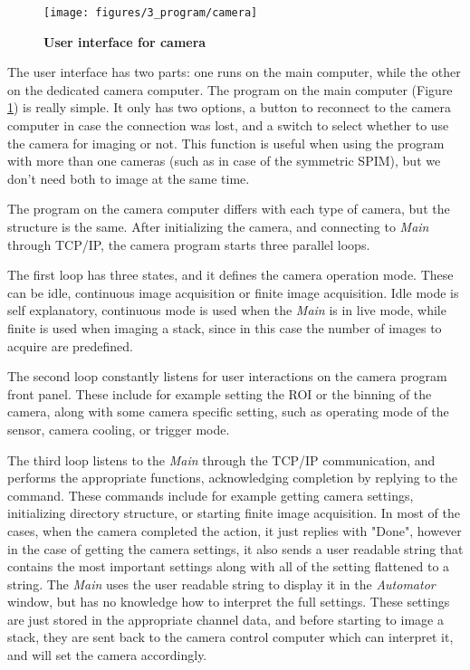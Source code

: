 \documentclass{diploma_style}
\begin{document}
\begin{figure}[htbp]
	\centering
	\texttt{[image: figures/3\_program/camera]}
	\caption{\textbf{User interface for camera}}
	\label{fig:ui_camera}
\end{figure}

The user interface has two parts: one runs on the main computer, while the other on the dedicated camera computer. The program on the main computer (Figure \ref{fig:ui_camera}) is really simple. It only has two options, a button to reconnect to the camera computer in case the connection was lost, and a switch to select whether to use the camera for imaging or not. This function is useful when using the program with more than one cameras (such as in case of the symmetric SPIM), but we don't need both to image at the same time.

The program on the camera computer differs with each type of camera, but the structure is the same. After initializing the camera, and connecting to \emph{Main} through TCP/IP, the camera program starts three parallel loops.

The first loop has three states, and it defines the camera operation mode. These can be idle, continuous image acquisition or finite image acquisition. Idle mode is self explanatory, continuous mode is used when the \emph{Main} is in live mode, while finite is used when imaging a stack, since in this case the number of images to acquire are predefined.

The second loop constantly listens for user interactions on the camera program front panel. These include for example setting the ROI or the binning of the camera, along with some camera specific setting, such as operating mode of the sensor, camera cooling, or trigger mode.

The third loop listens to the \emph{Main} through the TCP/IP communication, and performs the appropriate functions, acknowledging completion by replying to the command. These commands include for example getting camera settings, initializing directory structure, or starting finite image acquisition. In most of the cases, when the camera completed the action, it just replies with "Done", however in the case of getting the camera settings, it also sends a user readable string that contains the most important settings along with all of the setting flattened to a string. The \emph{Main} uses the user readable string to display it in the \emph{Automator} window, but has no knowledge how to interpret the full settings. These settings are just stored in the appropriate channel data, and before starting to image a stack, they are sent back to the camera control computer which can interpret it, and will set the camera accordingly.
\end{document}
